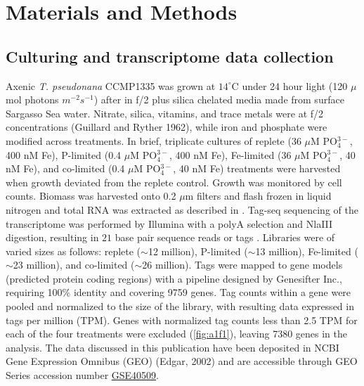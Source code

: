 \section{Materials and Methods}
\subsection{Culturing and transcriptome data collection} 
Axenic \textit{T. pseudonana} CCMP1335 was grown at $14^{\circ}$C under 24 hour light (120 $\mu$mol photons $m^{-2} s^{-1}$) after \citet{Dyhrman2012} in f/2 plus silica chelated media made from surface Sargasso Sea water. Nitrate, silica, vitamins, and trace metals were at f/2 concentrations (Guillard and Ryther 1962), while iron and phosphate were modified across treatments. In brief, triplicate cultures of replete (36 $\mu$M PO$_{4}^{3-}$, 400 nM Fe), P-limited (0.4 $\mu$M PO$_{4}^{3-}$, 400 nM Fe), Fe-limited (36 $\mu$M PO$_{4}^{3-}$, 40 nM Fe), and co-limited (0.4 $\mu$M PO$_{4}^{3-}$, 40 nM Fe) treatments were harvested when growth deviated from the replete control. Growth was monitored by cell counts. Biomass was harvested onto 0.2 $\mu$m filters and flash frozen in liquid nitrogen and total RNA was extracted as described in \citep{Dyhrman2012}. Tag-seq sequencing of the transcriptome was performed by Illumina with a polyA selection and NlaIII digestion, resulting in $21$ base pair sequence reads or tags \citep{Dyhrman2012}. Libraries were of varied sizes as follows: replete ($\sim$12 million), P-limited ($\sim$13 million), Fe-limited ($\sim$23 million), and co-limited ($\sim$26 million). Tags were mapped to gene models (predicted protein coding regions) with a pipeline designed by Genesifter Inc., requiring 100\% identity and covering 9759 genes. Tag counts within a gene were pooled and normalized to the size of the library, with resulting data expressed in tags per million (TPM). Genes with normalized tag counts less than 2.5 TPM for each of the four treatments were excluded (\cref{fig:a1f1}), leaving 7380 genes in the analysis. The data discussed in this publication have been deposited in NCBI Gene Expression Omnibus (GEO) (Edgar, 2002) and are accessible through GEO Series accession number \href{http://www.ncbi.nlm.nih.gov/geo/query/acc.cgi?acc=GSE40509}{GSE40509}.  
